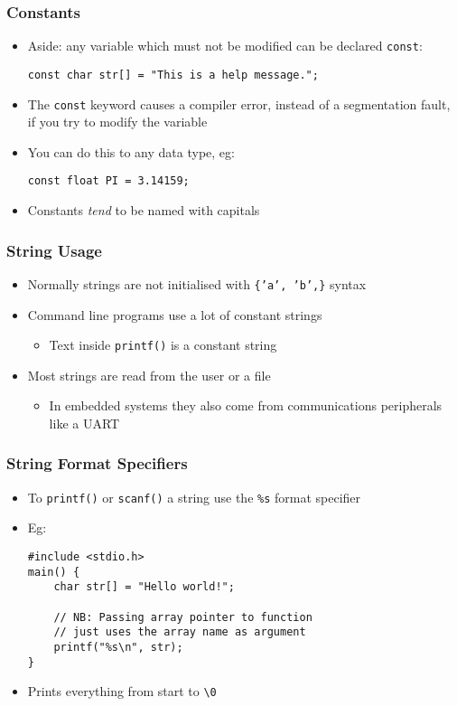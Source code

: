 \documentclass[14pt]{beamer}
\begin{document}
\begin{frame}[fragile]
\frametitle{Constants}
\begin{itemize}
\item Aside: any variable which must not be modified can be declared \texttt{const}:
\begin{lstlisting}[style=CStyle]
const char str[] = "This is a help message.";
\end{lstlisting}
\item The \texttt{const} keyword causes a compiler error, instead of a segmentation fault, if you try to modify the variable
\item You can do this to any data type, eg:
\begin{lstlisting}[style=CStyle]
const float PI = 3.14159;
\end{lstlisting}
\item Constants \textit{tend} to be named with capitals
\end{itemize}
\end{frame}

\begin{frame}
\frametitle{String Usage}
\begin{itemize}
\item Normally strings are not initialised with \texttt{\{'a', 'b',\}} syntax
\item Command line programs use a lot of constant strings
	\begin{itemize}
		\item Text inside \texttt{printf()} is a constant string
	\end{itemize}
\item Most strings are read from the user or a file
	\begin{itemize}
		\item In embedded systems they also come from communications peripherals like a UART
	\end{itemize}
\end{itemize}
\end{frame}

\begin{frame}[fragile]
\frametitle{String Format Specifiers}
\begin{itemize}
\item To \texttt{printf()} or \texttt{scanf()} a string use the \texttt{\%s} format specifier
\item Eg:
\begin{lstlisting}[style=CStyle]
#include <stdio.h>
main() {
	char str[] = "Hello world!";
	
	// NB: Passing array pointer to function
	// just uses the array name as argument
	printf("%s\n", str);
}
\end{lstlisting}
\item Prints everything from start to \texttt{\textbackslash 0}
\end{itemize}
\end{frame}
\end{document}
